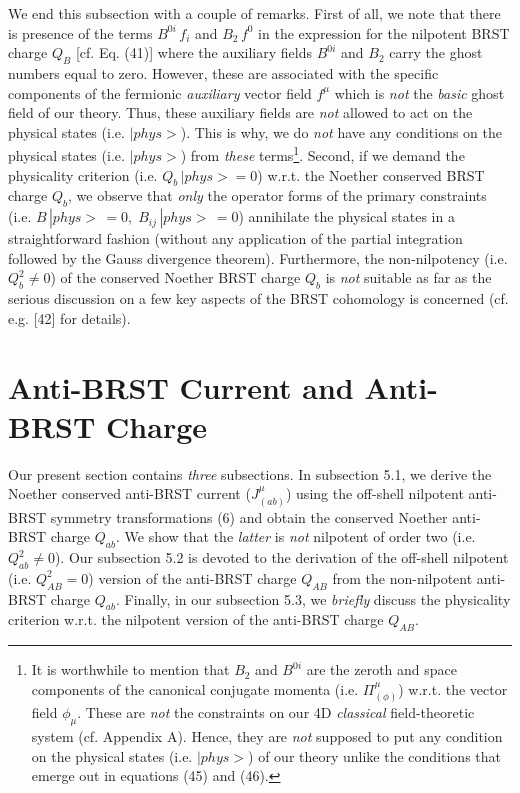 \documentclass[12pt]{article}
\begin{document}
We end this subsection with a couple of remarks. First of all, we note that there is presence of the terms $B^{0i}\, f_i $ and $B_2 \, f^0$ 
in the expression for the 
nilpotent BRST charge $Q_B$ [cf. Eq. (41)] where the auxiliary fields
$B^{0i}$ and  $B_2$ carry the ghost numbers equal to zero. However, these are associated with
the specific components of the fermionic {\it auxiliary} vector field $f^\mu$ which is {\it not} the
{\it basic} ghost field of our theory. Thus, these auxiliary fields  
are {\it not} allowed to act on the physical states (i.e. $|phys>$). This is why, we do {\it not} have any 
conditions on the physical states (i.e. $|phys>$) from {\it these} terms\footnote{It is worthwhile to mention
that $B_2$ and $B^{0i}$ are the zeroth and space components of the canonical conjugate momenta (i.e. $\Pi^\mu_{(\phi)} $)  w.r.t. the 
vector field $\phi_\mu$. These are {\it not} the constraints on our 4D {\it classical} field-theoretic system
(cf. Appendix A). Hence, they are {\it not} supposed to put any condition on the physical states (i.e. $|phys>$) of our theory
unlike the conditions that emerge out in equations (45) and (46).}. Second, if we demand the physicality criterion 
(i.e. $Q_b \, |phys> = 0$) w.r.t. the Noether conserved BRST charge $Q_b$, we observe that {\it only} the operator forms of the primary
constraints (i.e. $B\, |phys> \, = 0, \; B_{ij}\, |phys> \, = 0 $) annihilate the physical states in a straightforward fashion
(without any application of the partial integration followed by the Gauss divergence theorem). Furthermore, the non-nilpotency 
(i.e. $Q_b^2 \neq 0 $) of the conserved Noether BRST charge $Q_b$ is {\it not} suitable as far as  the serious discussion on 
a few key aspects of the BRST cohomology is concerned (cf. e.g. [42] for details). \\






\section{Anti-BRST Current and Anti-BRST Charge}




Our present section contains {\it three} subsections. In subsection 5.1, we derive the Noether conserved anti-BRST current ($J^\mu_{(ab)}$)
using  the  off-shell nilpotent anti-BRST symmetry transformations (6) and obtain the conserved Noether anti-BRST charge $Q_{ab}$. We
show that the {\it latter} is {\it not} nilpotent of order two (i.e. $Q_{ab}^2 \neq 0$). Our subsection 5.2 is devoted to the derivation of the
off-shell nilpotent (i.e. $ Q_{AB}^2 = 0$) version of the anti-BRST charge $Q_{AB}$ from the non-nilpotent 
anti-BRST charge $Q_{ab}$. Finally, in our subsection 5.3, we {\it briefly} discuss the 
physicality criterion w.r.t. the nilpotent version of the anti-BRST charge $Q_{AB}$.\\
\end{document}
